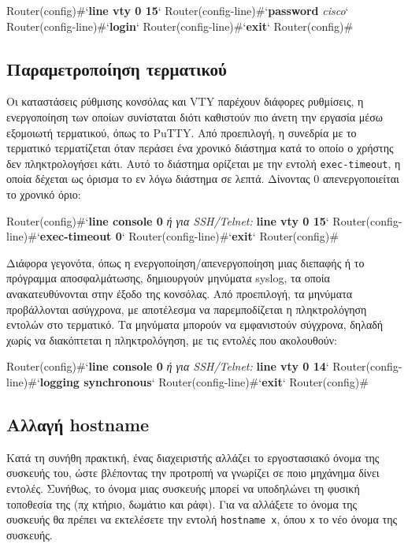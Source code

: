 \documentclass{EdipyLabs} %
\begin{document}
\begin{CommandBox}
Router(config)#`\textbf{line vty 0 15}`
Router(config-line)#`\textbf{password} \textit{cisco}`
Router(config-line)#`\textbf{login}`
Router(config-line)#`\textbf{exit}`
Router(config)#
\end{CommandBox}

\subsection{Παραμετροποίηση τερματικού}

Οι καταστάσεις ρύθμισης κονσόλας και VTY παρέχουν διάφορες ρυθμίσεις, η ενεργοποίηση των οποίων συνίσταται διότι καθιστούν πιο άνετη την εργασία μέσω εξομοιωτή τερματικού, όπως το PuTTY. Από προεπιλογή, η συνεδρία με το τερματικό τερματίζεται όταν περάσει ένα χρονικό διάστημα κατά το οποίο ο χρήστης δεν πληκτρολογήσει κάτι. Αυτό το διάστημα ορίζεται με την εντολή \texttt{exec-timeout}, η οποία δέχεται ως όρισμα το εν λόγω διάστημα σε λεπτά. Δίνοντας 0 απενεργοποιείται το χρονικό όριο:

\begin{CommandBox}
Router(config)#`\textbf{line console 0} \textrm{\textit{ή για SSH/Telnet:}} \textbf{line vty 0 15}`
Router(config-line)#`\textbf{exec-timeout 0}`
Router(config-line)#`\textbf{exit}`
Router(config)#
\end{CommandBox}

Διάφορα γεγονότα, όπως η ενεργοποίηση/απενεργοποίηση μιας διεπαφής ή το πρόγραμμα αποσφαλμάτωσης, δημιουργούν μηνύματα syslog, τα οποία ανακατευθύνονται στην έξοδο της κονσόλας. Από προεπιλογή, τα μηνύματα προβάλλονται ασύγχρονα, με αποτέλεσμα να παρεμποδίζεται η πληκτρολόγηση εντολών στο τερματικό. Τα μηνύματα μπορούν να εμφανιστούν σύγχρονα, δηλαδή χωρίς να διακόπτεται η πληκτρολόγηση, με τις εντολές που ακολουθούν:

\begin{CommandBox}
Router(config)#`\textbf{line console 0} \textrm{\textit{ή για SSH/Telnet:}} \textbf{line vty 0 14}`
Router(config-line)#`\textbf{logging synchronous}`
Router(config-line)#`\textbf{exit}`
Router(config)#
\end{CommandBox}

\subsection{Αλλαγή hostname}
Κατά τη συνήθη πρακτική, ένας διαχειριστής αλλάζει το εργοστασιακό όνομα της συσκευής του, ώστε βλέποντας την προτροπή να γνωρίζει σε ποιο μηχάνημα δίνει εντολές. Συνήθως, το όνομα μιας συσκευής μπορεί να υποδηλώνει τη φυσική τοποθεσία της (πχ κτήριο, δωμάτιο και ράφι). Για να αλλάξετε το όνομα της συσκευής θα πρέπει να εκτελέσετε την εντολή \texttt{hostname x}, όπου \texttt{x} το νέο όνομα της συσκευής.
\end{document}
